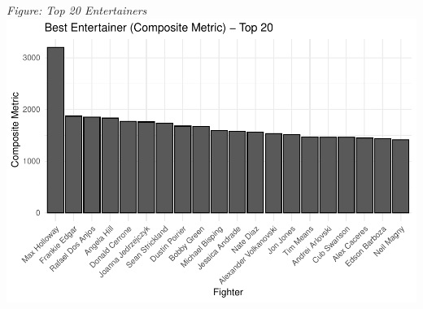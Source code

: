 \documentclass[
  man,floatsintext]{apa6}
\begin{document}
\emph{Figure: Top 20 Entertainers}
\includegraphics{Into-the-UFC--outline-_files/figure-latex/unnamed-chunk-2-1.pdf}
\end{document}
